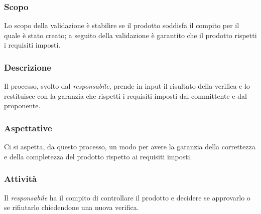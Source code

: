 \subsubsection{Scopo}

Lo scopo della validazione è stabilire se il prodotto soddisfa il compito per il quale è stato creato; a seguito della 
validazione è garantito che il prodotto rispetti i requisiti imposti.

\subsubsection{Descrizione}
\label{ssub:descrizione}

Il processo, svolto dal \emph{responsabile}, prende in input il risultato della verifica e lo restituisce con la 
garanzia che rispetti i requisiti imposti dal committente e dal proponente.

\subsubsection{Aspettative}
\label{ssub:aspettative}

Ci si aspetta, da questo processo, un modo per avere la garanzia della correttezza e della completezza del prodotto 
rispetto ai requisiti imposti.

\subsubsection{Attività}
\label{ssub:attivita}
Il \emph{responsabile} ha il compito di controllare il prodotto e decidere se approvarlo o se rifiutarlo chiedendone una 
nuova verifica.